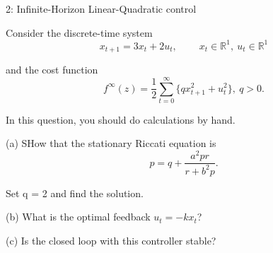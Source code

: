 
\begin{problem}{2: Infinite-Horizon Linear-Quadratic control}

Consider the discrete-time system
\[
  x_{t+1} = 3x_t + 2u_t,\ \qquad x_t \in\mathbb{R}^{1},\ u_t \in \mathbb{R}^{1}
\] 

and the cost function 
\[
  f^{\infty}(z) = \frac{1}{2}\sum_{t=0}^{\infty} \{qx_{t+1}^2 +u_t^2 \},\  q>0
.\] 

In this question, you should do calculations by hand. 

\medskip (a) SHow that the stationary Riccati equation is 
\[
  p = q + \frac{a^2pr}{r+b^2p}
.\] 

Set q = 2 and find the solution.

\medskip (b) What is the optimal feedback $u_t = -kx_t$?

\medskip (c) Is the closed loop with this controller stable?

\end{problem}

